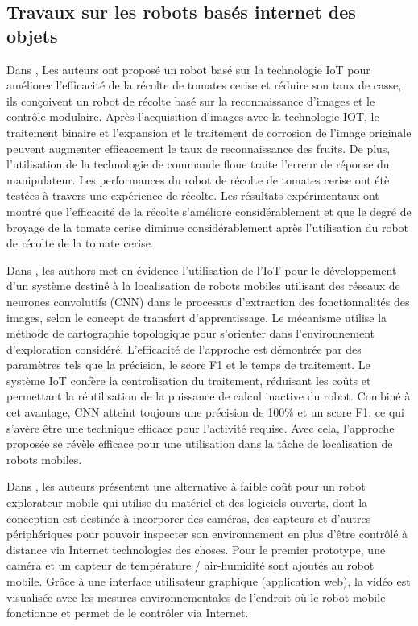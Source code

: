 \subsection{Travaux sur les robots basés internet des objets }
Dans \cite{chap316}, Les auteurs ont proposé un robot basé sur la technologie IoT pour améliorer l'efficacité de la récolte de tomates cerise et réduire son taux de casse, ils conçoivent un robot de récolte basé sur la reconnaissance d'images et le contrôle modulaire. Après l'acquisition d'images avec la technologie IOT, le traitement binaire et l'expansion et le traitement de corrosion de l'image originale peuvent augmenter efficacement le taux de reconnaissance des fruits. De plus, l'utilisation de la technologie de commande floue traite l'erreur de réponse du manipulateur. Les performances du robot de récolte de tomates cerise ont étè testées à travers une expérience de récolte. Les résultats expérimentaux ont montré que l'efficacité de la récolte s'améliore considérablement et que le degré de broyage de la tomate cerise diminue considérablement après l'utilisation du robot de récolte de la tomate cerise.


Dans \cite{chap317},  les authors met en évidence l'utilisation de l'IoT pour le développement d'un système destiné à la localisation de robots mobiles utilisant des réseaux de neurones convolutifs (CNN) dans le processus d'extraction des fonctionnalités des images, selon le concept de transfert d'apprentissage. Le mécanisme utilise la méthode de cartographie topologique pour s'orienter dans l'environnement d'exploration considéré. L'efficacité de l'approche est démontrée par des paramètres tels que la précision, le score F1 et le temps de traitement. Le système IoT confère la centralisation du traitement, réduisant les coûts et permettant la réutilisation de la puissance de calcul inactive du robot. Combiné à cet avantage, CNN atteint toujours une précision de 100\% et un score F1, ce qui s'avère être une technique efficace pour l'activité requise. Avec cela, l'approche proposée se révèle efficace pour une utilisation dans la tâche de localisation de robots mobiles.


Dans \cite{chap318}, les auteurs présentent une alternative à faible coût pour un robot explorateur mobile qui utilise du matériel et des logiciels ouverts, dont la conception est destinée à incorporer des caméras, des capteurs et d'autres périphériques pour pouvoir inspecter son environnement en plus d'être contrôlé à distance via Internet technologies des choses. Pour le premier prototype, une caméra et un capteur de température / air-humidité sont ajoutés au robot mobile. Grâce à une interface utilisateur graphique (application web), la vidéo est visualisée avec les mesures environnementales de l'endroit où le robot mobile fonctionne et permet de le contrôler via Internet.


